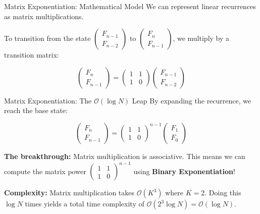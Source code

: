 \documentclass[aspectratio=169]{beamer}
\begin{document}
\begin{frame}{Matrix Exponentiation: Mathematical Model}
    We can represent linear recurrences as matrix multiplications.
    
    \vspace{0.3cm}
    To transition from the state $\begin{pmatrix} F_{n-1} \\ F_{n-2} \end{pmatrix}$ to $\begin{pmatrix} F_n \\ F_{n-1} \end{pmatrix}$, we multiply by a transition matrix:
    
    $$
    \begin{pmatrix} F_n \\ F_{n-1} \end{pmatrix} = \begin{pmatrix} 1 & 1 \\ 1 & 0 \end{pmatrix} \begin{pmatrix} F_{n-1} \\ F_{n-2} \end{pmatrix}
    $$
    
    
\end{frame}

\begin{frame}{Matrix Exponentiation: The $\mathcal{O}(\log N)$ Leap}
    By expanding the recurrence, we reach the base state:
    
    $$
    \begin{pmatrix} F_n \\ F_{n-1} \end{pmatrix} = \begin{pmatrix} 1 & 1 \\ 1 & 0 \end{pmatrix}^{n-1} \begin{pmatrix} F_1 \\ F_0 \end{pmatrix}
    $$
    
    \vspace{0.3cm}
    \textbf{The breakthrough:} Matrix multiplication is associative. This means we can compute the matrix power $\begin{pmatrix} 1 & 1 \\ 1 & 0 \end{pmatrix}^{n-1}$ using \textbf{Binary Exponentiation}!
    
    \vspace{0.3cm}
    \textbf{Complexity:} 
    Matrix multiplication takes $\mathcal{O}(K^3)$ where $K=2$. Doing this $\log N$ times yields a total time complexity of $\mathcal{O}(2^3 \log N) = \mathcal{O}(\log N)$.
\end{frame}
\end{document}
